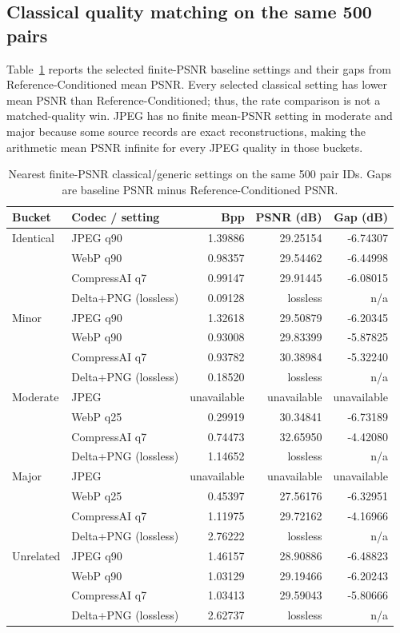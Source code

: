 \documentclass[conference]{IEEEtran}
\begin{document}
\subsection{Classical quality matching on the same 500 pairs}
Table~\ref{tab:matched} reports the selected finite-PSNR baseline settings and their gaps from Reference-Conditioned mean PSNR. Every selected classical setting has lower mean PSNR than Reference-Conditioned; thus, the rate comparison is not a matched-quality win. JPEG has no finite mean-PSNR setting in moderate and major because some source records are exact reconstructions, making the arithmetic mean PSNR infinite for every JPEG quality in those buckets.

\begin{table}[t]
\caption{Nearest finite-PSNR classical/generic settings on the same 500 pair IDs. Gaps are baseline PSNR minus Reference-Conditioned PSNR.}
\label{tab:matched}
\centering
\scriptsize
\begin{tabular}{llrrr}
\toprule
Bucket & Codec / setting & Bpp & PSNR (dB) & Gap (dB)\\
\midrule
Identical & JPEG q90 & 1.39886 & 29.25154 & -6.74307\\
& WebP q90 & 0.98357 & 29.54462 & -6.44998\\
& CompressAI q7 & 0.99147 & 29.91445 & -6.08015\\
& Delta+PNG (lossless) & 0.09128 & lossless & n/a\\
\midrule
Minor & JPEG q90 & 1.32618 & 29.50879 & -6.20345\\
& WebP q90 & 0.93008 & 29.83399 & -5.87825\\
& CompressAI q7 & 0.93782 & 30.38984 & -5.32240\\
& Delta+PNG (lossless) & 0.18520 & lossless & n/a\\
\midrule
Moderate & JPEG & unavailable & unavailable & unavailable\\
& WebP q25 & 0.29919 & 30.34841 & -6.73189\\
& CompressAI q7 & 0.74473 & 32.65950 & -4.42080\\
& Delta+PNG (lossless) & 1.14652 & lossless & n/a\\
\midrule
Major & JPEG & unavailable & unavailable & unavailable\\
& WebP q25 & 0.45397 & 27.56176 & -6.32951\\
& CompressAI q7 & 1.11975 & 29.72162 & -4.16966\\
& Delta+PNG (lossless) & 2.76222 & lossless & n/a\\
\midrule
Unrelated & JPEG q90 & 1.46157 & 28.90886 & -6.48823\\
& WebP q90 & 1.03129 & 29.19466 & -6.20243\\
& CompressAI q7 & 1.03413 & 29.59043 & -5.80666\\
& Delta+PNG (lossless) & 2.62737 & lossless & n/a\\
\bottomrule
\end{tabular}
\end{table}
\end{document}
